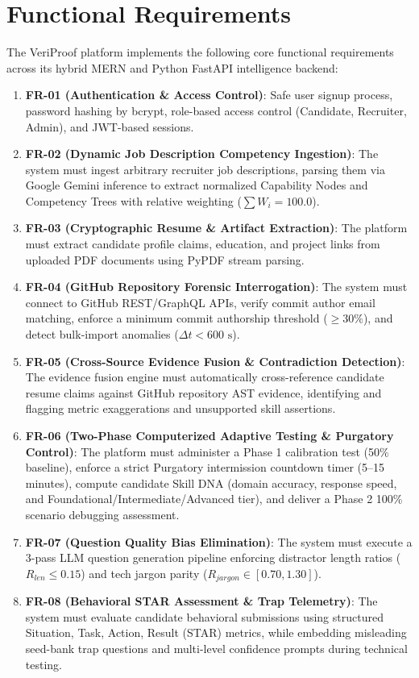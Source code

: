 \section{Functional Requirements}
The VeriProof platform implements the following core functional requirements across its hybrid MERN and Python FastAPI intelligence backend:
\begin{enumerate}
    \item \textbf{FR-01 (Authentication \& Access Control)}: Safe user signup process, password hashing by bcrypt, role-based access control (Candidate, Recruiter, Admin), and JWT-based sessions.
    \item \textbf{FR-02 (Dynamic Job Description Competency Ingestion)}: The system must ingest arbitrary recruiter job descriptions, parsing them via Google Gemini inference to extract normalized Capability Nodes and Competency Trees with relative weighting ($\sum W_i = 100.0$).
    \item \textbf{FR-03 (Cryptographic Resume \& Artifact Extraction)}: The platform must extract candidate profile claims, education, and project links from uploaded PDF documents using PyPDF stream parsing.
    \item \textbf{FR-04 (GitHub Repository Forensic Interrogation)}: The system must connect to GitHub REST/GraphQL APIs, verify commit author email matching, enforce a minimum commit authorship threshold ($\ge 30\%$), and detect bulk-import anomalies ($\Delta t < 600\text{ s}$).
    \item \textbf{FR-05 (Cross-Source Evidence Fusion \& Contradiction Detection)}: The evidence fusion engine must automatically cross-reference candidate resume claims against GitHub repository AST evidence, identifying and flagging metric exaggerations and unsupported skill assertions.
    \item \textbf{FR-06 (Two-Phase Computerized Adaptive Testing \& Purgatory Control)}: The platform must administer a Phase 1 calibration test (50\% baseline), enforce a strict Purgatory intermission countdown timer (5--15 minutes), compute candidate Skill DNA (domain accuracy, response speed, and Foundational/Intermediate/Advanced tier), and deliver a Phase 2 100\% scenario debugging assessment.
    \item \textbf{FR-07 (Question Quality Bias Elimination)}: The system must execute a 3-pass LLM question generation pipeline enforcing distractor length ratios ($R_{len} \le 0.15$) and tech jargon parity ($R_{jargon} \in [0.70, 1.30]$).
    \item \textbf{FR-08 (Behavioral STAR Assessment \& Trap Telemetry)}: The system must evaluate candidate behavioral submissions using structured Situation, Task, Action, Result (STAR) metrics, while embedding misleading seed-bank trap questions and multi-level confidence prompts during technical testing.

\end{enumerate}

